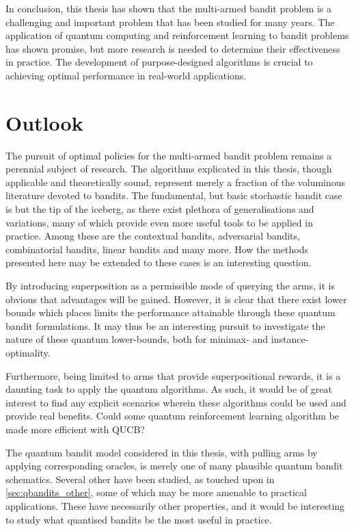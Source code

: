 In conclusion, this thesis has shown that the multi-armed bandit problem is a challenging and important problem that has been studied for many years.
The application of quantum computing and reinforcement learning to bandit problems has shown promise, but more research is needed to determine their effectiveness in practice.
The development of purpose-designed algorithms is crucial to achieving optimal performance in real-world applications.

\section{Outlook}
The pursuit of optimal policies for the multi-armed bandit problem remains a perennial subject of research.
The algorithms explicated in this thesis, though applicable and theoretically sound, represent merely a fraction of the voluminous literature devoted to bandits.
The fundamental, but basic stochastic bandit case is but the tip of the iceberg, as there exist plethora of generalisations and variations, many of which provide even more useful tools to be applied in practice.
Among these are the contextual bandits, adversarial bandits, combinatorial bandits, linear bandits and many more.
How the methods presented here may be extended to these cases is an interesting question.

By introducing superposition as a permissible mode of querying the arms, it is obvious that advantages will be gained.
However, it is clear that there exist lower bounds which places limits the performance attainable through these quantum bandit formulations.
It may thus be an interesting pursuit to investigate the nature of these quantum lower-bounds, both for minimax- and instance-optimality.

Furthermore, being limited to arms that provide superpositional rewards, it is a daunting task to apply the quantum algorithms.
As such, it would be of great interest to find any explicit scenarios wherein these algorithms could be used and provide real benefits.
Could some quantum reinforcement learning algorithm be made more efficient with QUCB?

The quantum bandit model considered in this thesis, with pulling arms by applying corresponding oracles, is merely one of many plausible quantum bandit schematics.
Several other have been studied, as touched upon in \cref{sec:qbandits_other}, some of which may be more amenable to practical applications.
These have necessarily other properties, and it would be interesting to study what quantised bandits be the most useful in practice.

